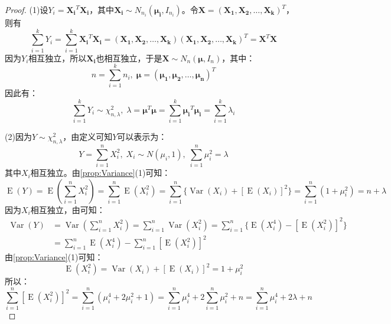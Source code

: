 \begin{proof}
	(1)设$Y_i=\mathbf{X_i}^T\mathbf{X_i}$，其中$\mathbf{X_i}\sim N_{n_i}(\boldsymbol{\mu_i},I_{n_i})$。令$\mathbf{X}=(\mathbf{X_1},\mathbf{X_2},\dots,\mathbf{X_k})^T$，则有
	\begin{equation*}
		\sum_{i=1}^{k}Y_i=\sum_{i=1}^{k}\mathbf{X_i}^T\mathbf{X_i}=(\mathbf{X_1},\mathbf{X_2},\dots,\mathbf{X_k})(\mathbf{X_1},\mathbf{X_2},\dots,\mathbf{X_k})^T=\mathbf{X}^T\mathbf{X}
	\end{equation*}
	因为$Y_i$相互独立，所以$\mathbf{X_i}$也相互独立，于是$\mathbf{X}\sim N_n(\boldsymbol{\mu},I_n)$，其中：
	\begin{equation*}
		n=\sum_{i=1}^{k}n_i,\;\boldsymbol{\mu}=(\boldsymbol{\mu_1},\boldsymbol{\mu_2},\dots,\boldsymbol{\mu_n})^T
	\end{equation*}
	因此有：
	\begin{equation*}
		\sum_{i=1}^{k}Y_i\sim\chi_{n,\lambda}^2,\;\lambda=\boldsymbol{\mu}^T\boldsymbol{\mu}=\sum_{i=1}^{k}\boldsymbol{\mu_i}^T\boldsymbol{\mu_i}=\sum_{i=1}^{k}\lambda_i
	\end{equation*}\par
	(2)因为$Y\sim\chi_{n,\lambda}^2$，由定义可知$Y$可以表示为：
	\begin{equation*}
		Y=\sum_{i=1}^{n}X_i^2,\;X_i\sim N(\mu_i,1),\;\sum_{i=1}^{n}\mu_i^2=\lambda
	\end{equation*}
	其中$X_i$相互独立。由\cref{prop:Variance}(1)可知：
	\begin{equation*}
		\operatorname{E}(Y)=\operatorname{E}\left(\sum_{i=1}^{n}X_i^2\right)=\sum_{i=1}^{n}\operatorname{E}(X_i^2)=\sum_{i=1}^{n}\{\operatorname{Var}(X_i)+[\operatorname{E}(X_i)]^2\}=\sum_{i=1}^{n}(1+\mu_i^2)=n+\lambda
	\end{equation*}
	因为$X_i$相互独立，由可知：
	\begin{align*}
		\operatorname{Var}(Y)
		&=\operatorname{Var}\left(\sum_{i=1}^{n}X_i^2\right)=\sum_{i=1}^{n}\operatorname{Var}(X_i^2)=\sum_{i=1}^{n}\{\operatorname{E}(X_i^4)-[\operatorname{E}(X_i^2)]^2\} \\
		&=\sum_{i=1}^{n}\operatorname{E}(X_i^4)-\sum_{i=1}^{n}[\operatorname{E}(X_i^2)]^2
	\end{align*}
	由\cref{prop:Variance}(1)可知：
	\begin{equation*}
		\operatorname{E}(X_i^2)=\operatorname{Var}(X_i)+[\operatorname{E}(X_i)]^2=1+\mu_i^2
	\end{equation*}
	所以：
	\begin{equation*}
		\sum_{i=1}^{n}[\operatorname{E}(X_i^2)]^2=\sum_{i=1}^{n}(\mu_i^4+2\mu_i^2+1)=\sum_{i=1}^{n}\mu_i^4+2\sum_{i=1}^{n}\mu_i^2+n=\sum_{i=1}^{n}\mu_i^4+2\lambda+n

\end{equation*}
\end{proof}
